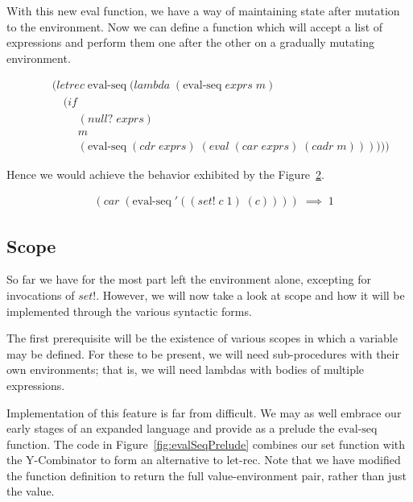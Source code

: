 With this new eval function, we have a way of maintaining state after 
mutation to the environment. Now we can define a function which will accept
a list of expressions and perform them one after the other on a gradually
mutating environment.

\begin{figure}[htp]
\footnotesize
\caption{}\label{fig:evalSeqDef}
\begin{align*}
& (letrec \; \text{eval-seq} \; (lambda \; (\text{eval-seq} \; exprs \; m)
\\& \quad (if
\\& \qquad \; (null? \; exprs)
\\& \qquad \; m
\\& \qquad \; (\text{eval-seq} \; (cdr \; exprs) \; (eval \; (car \; exprs) \; (cadr \; m))))))
\end{align*}
\end{figure}

Hence we would achieve the behavior exhibited by the
Figure~\ref{fig:evalSeqExample}. 

\begin{figure}[htp]
\footnotesize
\caption{}\label{fig:evalSeqExample}
\begin{align*}
& (car \; (\text{eval-seq} \; '((set! \; c \; 1) \; (c)))) \; \implies \; 1
\end{align*}
\end{figure}

\subsection{Scope}
So far we have for the most part left the environment alone, excepting for
invocations of $set!$. However, we will now take a look at scope and how it
will be implemented through the various syntactic forms.

The first prerequisite will be the existence of various scopes in which a
variable may be defined. For these to be present, we will need sub-procedures
with their own environments; that is, we will need lambdas with bodies of
multiple expressions.

Implementation of this feature is far from difficult. We may as well embrace
our early stages of an expanded language and provide as a prelude the
$\text{eval-seq}$ function. The code in Figure~\ref{fig:evalSeqPrelude} combines our
set function with the Y-Combinator to form an alternative to $\text{let-rec}$. Note
that we have modified the function definition to return the full
value-environment pair, rather than just the value.

